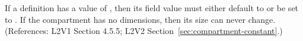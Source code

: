 If a \Compartment definition has a  value of
, then its  field value must either default to or be
set to .  If the compartment has no dimensions, then its size can
never change.  (References: L2V1 Section 4.5.5; L2V2
Section~\ref{sec:compartment-constant}.)
